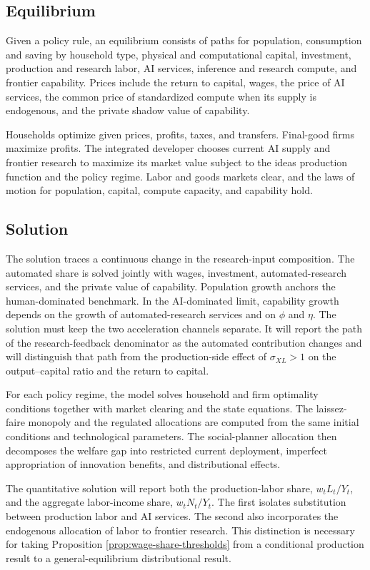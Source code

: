 \subsection{Equilibrium}

Given a policy rule, an equilibrium consists of paths for population, consumption and
saving by household type, physical and computational capital, investment, production
and research labor, AI services, inference and research compute, and frontier
capability. Prices include the return to capital, wages, the price of AI services, the
common price of standardized compute when its supply is endogenous, and the private
shadow value of capability.

Households optimize given prices, profits, taxes, and transfers. Final-good firms
maximize profits. The integrated developer chooses current AI supply and frontier
research to maximize its market value subject to the ideas production function and
the policy regime. Labor and goods markets clear, and the laws of motion for
population, capital, compute capacity, and capability hold.

\subsection{Solution}

The solution traces a continuous change in the research-input composition. The
automated share is solved jointly with wages, investment, automated-research
services, and the private value of capability. Population growth anchors the
human-dominated benchmark. In the AI-dominated limit, capability growth depends on
the growth of automated-research services and on $\phi$ and $\eta$.
The solution must keep the two acceleration channels separate. It will report the
path of the research-feedback denominator as the automated contribution changes and
will distinguish that path from the production-side effect of $\sigma_{XL}>1$ on
the output--capital ratio and the return to capital.

For each policy regime, the model solves household and firm optimality conditions
together with market clearing and the state equations. The laissez-faire monopoly
and the regulated allocations are computed from the same initial conditions and
technological parameters. The social-planner allocation then decomposes the welfare
gap into restricted current deployment, imperfect appropriation of innovation
benefits, and distributional effects.

The quantitative solution will report both the production-labor share,
$w_tL_t/Y_t$, and the aggregate labor-income share, $w_tN_t/Y_t$. The first
isolates substitution between production labor and AI services. The second also
incorporates the endogenous allocation of labor to frontier research. This
distinction is necessary for taking Proposition
\ref{prop:wage-share-thresholds} from a conditional production result to a
general-equilibrium distributional result.

